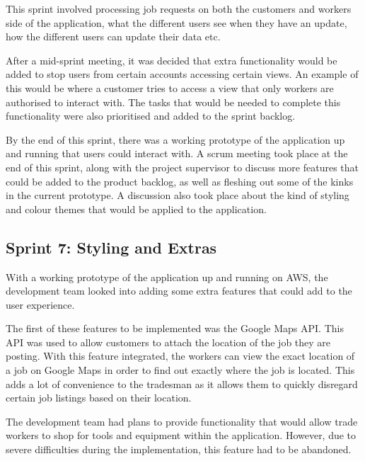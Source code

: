 This sprint involved processing job requests on both the customers and workers side of the application, what the different users see when they have an update, how the different users can update their data etc. 

\bigskip

After a mid-sprint meeting, it was decided that extra functionality would be added to stop users from certain accounts accessing certain views. An example of this would be where a customer tries to access a view that only workers are authorised to interact with. The tasks that would be needed to complete this functionality were also prioritised and added to the sprint backlog. 

\bigskip

By the end of this sprint, there was a working prototype of the application up and running that users could interact with. A scrum meeting took place at the end of this sprint, along with the project supervisor to discuss more features that could be added to the product backlog, as well as fleshing out some of the kinks in the current prototype. A discussion also took place about the kind of styling and colour themes that would be applied to the application. 


\subsection{Sprint 7: Styling and Extras}
\label{sec:MethodologySprint7}
With a working prototype of the application up and running on AWS, the development team looked into adding some extra features that could add to the user experience. 

\bigskip

The first of these features to be implemented was the Google Maps API. This API was used to allow customers to attach the location of the job they are posting. With this feature integrated, the workers can view the exact location of a job on Google Maps in order to find out exactly where the job is located. This adds a lot of convenience to the tradesman as it allows them to quickly disregard certain job listings based on their location.

\bigskip

The development team had plans to provide functionality that would allow trade workers to shop for tools and equipment within the application. However, due to severe difficulties during the implementation, this feature had to be abandoned.

\bigskip

